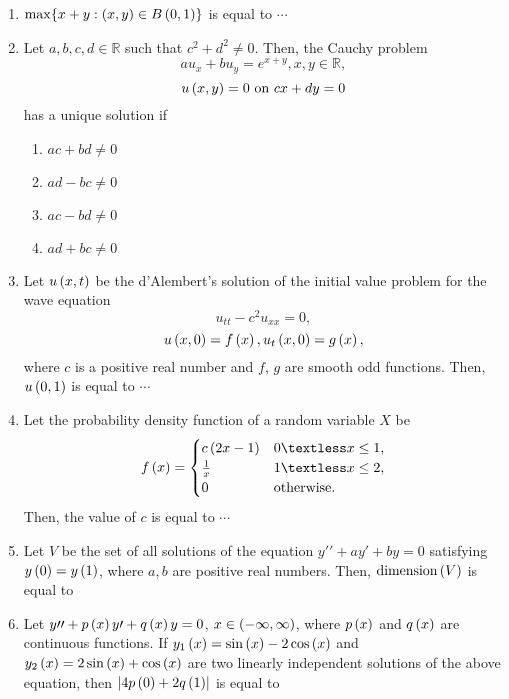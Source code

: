 \documentclass[journal,12pt,twocolumn]{IEEEtran}
\theoremstyle{remark}
\begin{document}
\begin{enumerate}[start=1]
    \item $\max \{x+y : \left(x, y\right) \in B\left(0,1\right)\}$ is equal to $\cdots$



    \item Let $a, b, c, d \in \mathbb{R}$ such that $c^2 + d^2 \neq 0$. Then, the Cauchy problem
    $$a u_x + b u_y = e^{x+y},  x, y \in \mathbb{R},$$
    $$u\left(x,y\right) = 0 \text{ on } cx + dy = 0$$
    has a unique solution if
    \begin{enumerate}
        \item $a c + b d \neq 0$
        \item $a d - b c \neq 0$
        \item $a c - b d \neq 0$
        \item $a d + b c \neq 0$
    \end{enumerate}


    \item Let $u\left(x, t\right)$ be the d'Alembert's solution of the initial value problem for the wave equation
    $$u_{tt} - c^2 u_{xx} = 0,$$
    $$u\left(x, 0\right) = f\left(x\right), u_t\left(x, 0\right) = g\left(x\right),$$
    where $c$ is a positive real number and $f$, $g$ are smooth odd functions. Then, $u\left(0,1\right)$ is equal to $\cdots$

    \item Let the probability density function of a random variable $X$ be
    $$f\brak{x} = \begin{cases} 
      c\brak{2x - 1} & 0 \textless x \leq 1, \\
      \frac{1}{x} & 1 \textless x \leq 2, \\
      0 & \text{otherwise}.
   \end{cases}$$
    Then, the value of $c$ is equal to $\cdots$

    \item Let $V$ be the set of all solutions of the equation $y{\prime}{\prime} + a y{\prime} + b y = 0$ satisfying $y\left(0\right) = y\left(1\right)$, where $a, b$ are positive real numbers. Then, $\text{dimension}\left(V\right)$ is equal to

    \item Let $y{\prime}{\prime} + p\left(x\right) y{\prime} + q\left(x\right)y = 0$, $x \in \left(-\infty, \infty\right)$, where $p\left(x\right)$ and $q\left(x\right)$ are continuous functions. If $y_1\left(x\right) = \sin\left(x\right) - 2 \cos\left(x\right)$ and $y_2\left(x\right) = 2 \sin\left(x\right) + \cos\left(x\right)$ are two linearly independent solutions of the above equation, then $\left\vert 4p\left(0\right) + 2 q\left(1\right) \right\vert$ is equal to


\end{enumerate}
\end{document}
